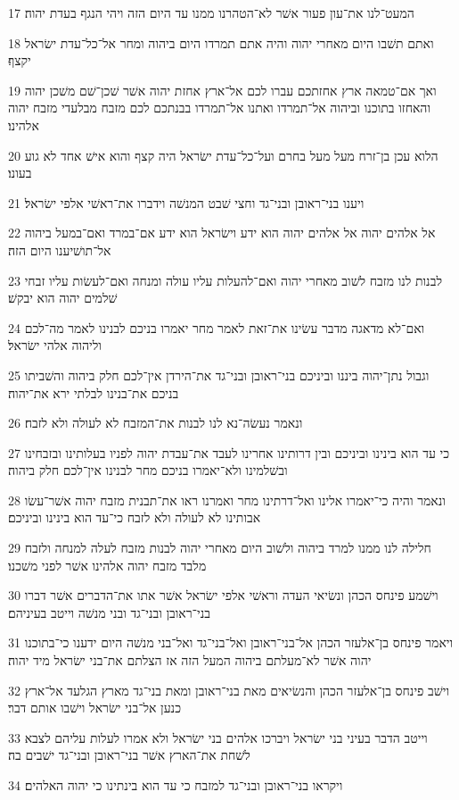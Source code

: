 \par 17 המעט־לנו את־עון פעור אשׁר לא־הטהרנו ממנו עד היום הזה ויהי הנגף בעדת יהוה׃
\par 18 ואתם תשׁבו היום מאחרי יהוה והיה אתם תמרדו היום ביהוה ומחר אל־כל־עדת ישׂראל יקצף׃
\par 19 ואך אם־טמאה ארץ אחזתכם עברו לכם אל־ארץ אחזת יהוה אשׁר שׁכן־שׁם משׁכן יהוה והאחזו בתוכנו וביהוה אל־תמרדו ואתנו אל־תמרדו בבנתכם לכם מזבח מבלעדי מזבח יהוה אלהינו׃
\par 20 הלוא עכן בן־זרח מעל מעל בחרם ועל־כל־עדת ישׂראל היה קצף והוא אישׁ אחד לא גוע בעונו׃
\par 21 ויענו בני־ראובן ובני־גד וחצי שׁבט המנשׁה וידברו את־ראשׁי אלפי ישׂראל׃
\par 22 אל אלהים יהוה אל אלהים יהוה הוא ידע וישׂראל הוא ידע אם־במרד ואם־במעל ביהוה אל־תושׁיענו היום הזה׃
\par 23 לבנות לנו מזבח לשׁוב מאחרי יהוה ואם־להעלות עליו עולה ומנחה ואם־לעשׂות עליו זבחי שׁלמים יהוה הוא יבקשׁ׃
\par 24 ואם־לא מדאגה מדבר עשׂינו את־זאת לאמר מחר יאמרו בניכם לבנינו לאמר מה־לכם וליהוה אלהי ישׂראל׃
\par 25 וגבול נתן־יהוה ביננו וביניכם בני־ראובן ובני־גד את־הירדן אין־לכם חלק ביהוה והשׁביתו בניכם את־בנינו לבלתי ירא את־יהוה׃
\par 26 ונאמר נעשׂה־נא לנו לבנות את־המזבח לא לעולה ולא לזבח׃
\par 27 כי עד הוא בינינו וביניכם ובין דרותינו אחרינו לעבד את־עבדת יהוה לפניו בעלותינו ובזבחינו ובשׁלמינו ולא־יאמרו בניכם מחר לבנינו אין־לכם חלק ביהוה׃
\par 28 ונאמר והיה כי־יאמרו אלינו ואל־דרתינו מחר ואמרנו ראו את־תבנית מזבח יהוה אשׁר־עשׂו אבותינו לא לעולה ולא לזבח כי־עד הוא בינינו וביניכם׃
\par 29 חלילה לנו ממנו למרד ביהוה ולשׁוב היום מאחרי יהוה לבנות מזבח לעלה למנחה ולזבח מלבד מזבח יהוה אלהינו אשׁר לפני משׁכנו׃
\par 30 וישׁמע פינחס הכהן ונשׂיאי העדה וראשׁי אלפי ישׂראל אשׁר אתו את־הדברים אשׁר דברו בני־ראובן ובני־גד ובני מנשׁה וייטב בעיניהם׃
\par 31 ויאמר פינחס בן־אלעזר הכהן אל־בני־ראובן ואל־בני־גד ואל־בני מנשׁה היום ידענו כי־בתוכנו יהוה אשׁר לא־מעלתם ביהוה המעל הזה אז הצלתם את־בני ישׂראל מיד יהוה׃
\par 32 וישׁב פינחס בן־אלעזר הכהן והנשׂיאים מאת בני־ראובן ומאת בני־גד מארץ הגלעד אל־ארץ כנען אל־בני ישׂראל וישׁבו אותם דבר׃
\par 33 וייטב הדבר בעיני בני ישׂראל ויברכו אלהים בני ישׂראל ולא אמרו לעלות עליהם לצבא לשׁחת את־הארץ אשׁר בני־ראובן ובני־גד ישׁבים בה׃
\par 34 ויקראו בני־ראובן ובני־גד למזבח כי עד הוא בינתינו כי יהוה האלהים׃

